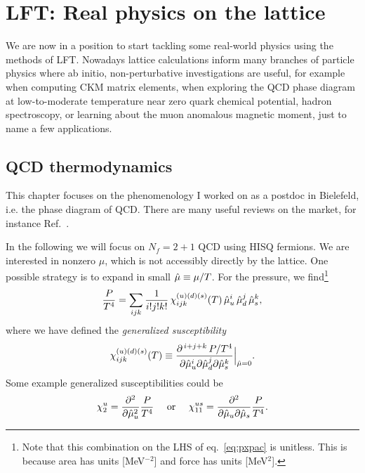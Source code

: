 \chapter{LFT: Real physics on the lattice}

We are now in a position to start tackling some real-world physics using the
methods of LFT. Nowadays lattice calculations inform many branches of particle
physics where ab initio, non-perturbative investigations are useful, for example
when computing CKM matrix elements, when exploring the QCD phase diagram at
low-to-moderate temperature near zero quark chemical potential, hadron
spectroscopy, or learning about the muon anomalous magnetic moment, just to name
a few applications.

\section{QCD thermodynamics}  

This chapter focuses on the phenomenology I worked on as a postdoc in
Bielefeld, i.e. the phase diagram of QCD. There are many useful reviews
on the market, for instance Ref.~\cite{ding_thermodynamics_2015}.

In the following we will focus on $N_f=2+1$ QCD using HISQ fermions. We are
interested in nonzero $\mu$, which is not accessibly directly by the lattice.
One possible strategy is to expand in small $\hat{\mu}\equiv\mu/T$. For the
pressure, we find\footnote{Note that this combination on the LHS of 
eq.~\eqref{eq:pxpac} is unitless. This is because area has units
[MeV$^{-2}$] and force has units [MeV$^2$].}
\begin{equation}\label{eq:pxpac}
\frac{P}{T^4}=\sum_{ijk}\frac{1}{i!j!k!}\,\chi_{ijk}^{(u)(d)(s)}(T)\,
               \hat{\mu}_u^i\,\hat{\mu}_d^j\,\hat{\mu}_s^k,
\end{equation}
where we have defined the {\it generalized susceptibility}
\begin{equation}
\chi_{ijk}^{(u)(d)(s)}(T)
  \equiv\frac{\partial^{\,i+j+k}\,P/T^4}{\partial\hat{\mu}_u^i\partial\hat{\mu}_d^j
                                       \partial\hat{\mu}_s^k}\Big|_{\hat{\mu}=0}.
\end{equation}
Some example generalized susceptibilities could be
\begin{equation}
  \chi_2^u=\frac{\partial^2}{\partial\hat{\mu}_u^2}\frac{P}{T^4}
  ~~~~\text{or}~~~~
  \chi_{11}^{us}=\frac{\partial^2}{\partial\hat{\mu}_u\partial\hat{\mu}_s}\frac{P}{T^4}.
\end{equation}

